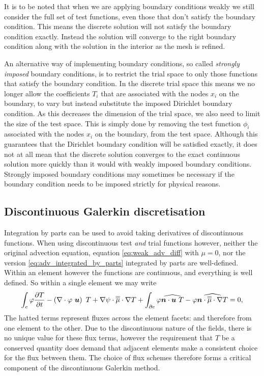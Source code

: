 It is to be noted that when we are applying boundary conditions weakly we
still consider the full set of test functions, even those that don't satisfy
the boundary condition. This means the discrete solution will not satisfy
the boundary condition exactly. Instead the solution will converge to the
right boundary condition along with the solution in the interior as the mesh
is refined.

 An alternative way of
implementing boundary conditions, so called \emph{strongly imposed} boundary
conditions, is to restrict the trial space to only those functions that
satisfy the boundary condition. In the discrete trial space this means we no
longer allow the coefficients $T_i$ that are associated with the nodes $x_i$
on the boundary, to vary but instead substitute the imposed Dirichlet
boundary condition. As this decreases the dimension of the trial space, we
also need to limit the size of the test space. This is simply done by
removing the test function $\phi_i$ associated with the nodes $x_i$ on the
boundary, from the test space. Although this guarantees that the Dirichlet
boundary condition will be satisfied exactly, it does not at all mean that
the discrete solution converges to the exact continuous solution more
quickly than it would with weakly imposed boundary conditions. Strongly
imposed boundary conditions may sometimes be necessary if the boundary
condition needs to be imposed strictly for physical reasons.

\subsection{Discontinuous Galerkin discretisation}\label{sec:NM_DG_advection}
Integration by parts can be used to avoid taking 
derivatives of discontinuous functions.
When using discontinuous test \emph{and} trial functions however, 
neither the original advection equation, equation \eqref{eq:weak_adv_diff} with $\mu=0$, 
nor the version \eqref{eq:adv_integrated_by_parts} integrated by parts are well-defined. 
Within an element however the functions are continuous, and everything is well defined. So within 
a single element we may write
\begin{equation}\label{eq:adv_diff_dg}
  \int_e \varphi \frac{\partial T}{\partial t} -
    \left(\nabla\cdot \varphi~{\mbox{\boldmath$u$}}\right)~T +
    \nabla\psi\cdot\overline{\overline{\mu}}\cdot\nabla T +
    \int_{\partial e} \varphi\widehat{{\mbox{\boldmath$n$}}\cdot{\mbox{\boldmath$u$}}~T} - 
    \varphi\widehat{{\mbox{\boldmath$n$}}\cdot\overline{\overline{\mu}}\cdot\nabla T}
    = 0,
\end{equation}
The hatted terms represent fluxes across the element facets: and therefore
from one element to the other. Due to the discontinuous nature of the
fields, there is no unique value for these flux terms, however the
requirement that $T$ be a conserved quantity does demand that adjacent
elements make a consistent choice for the flux between them. The choice of flux
schemes therefore forms a critical component of the discontinuous Galerkin
method.

